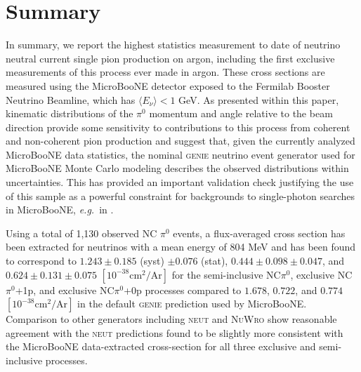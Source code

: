 \section{Summary}

In summary, we report the highest statistics measurement to date of neutrino neutral current single pion production on argon, including the first exclusive measurements of this process ever made in argon. These cross sections are measured using the MicroBooNE detector exposed to the Fermilab Booster Neutrino Beamline, which has $\langle E_{\nu} \rangle <1$ GeV. As presented within this paper,  kinematic distributions of the $\pi^0$ momentum and angle relative to the beam direction provide some sensitivity to contributions to this process from coherent and non-coherent pion production and suggest that, given the currently analyzed MicroBooNE data statistics, the nominal \textsc{genie} neutrino event generator used for MicroBooNE Monte Carlo modeling describes the observed distributions within uncertainties. This has provided an important validation check justifying the use of this sample as a powerful constraint for backgrounds to single-photon searches in MicroBooNE, \textit{e.g.}~in \cite{MicroBooNE:2021zai}. 

Using a total of 1,130 observed NC $\pi^0$ events, a flux-averaged cross section has been extracted for neutrinos with a mean energy of 804 MeV and has been found to correspond to $1.243\pm0.185$ (syst) $\pm0.076$ (stat), $0.444\pm0.098\pm0.047$, and $0.624\pm0.131\pm0.075$ $[10^{-38}\textrm{cm}^2/\textrm{Ar}]$ for the semi-inclusive NC$\pi^0$, exclusive NC$\pi^0$+1p, and exclusive NC$\pi^0$+0p processes compared to $1.678$, $0.722$, and $0.774$ $[10^{-38}\textrm{cm}^2/\textrm{Ar}]$ in the default \textsc{genie} prediction used by MicroBooNE. Comparison to other generators including \textsc{neut} and \textsc{NuWro} show reasonable agreement with the \textsc{neut} predictions found to be slightly more consistent with the MicroBooNE data-extracted cross-section for all three exclusive and semi-inclusive processes.

